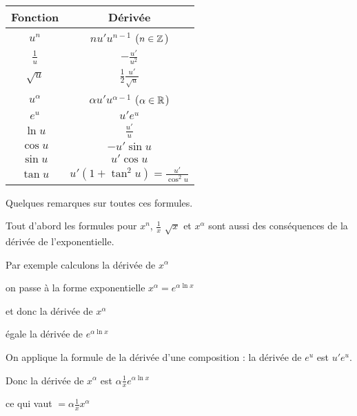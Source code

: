 \begin{tabular}[t]{cc@{\vrule depth 1.2ex height 3ex width 0mm \ }} 
\textbf{Fonction}         & \textbf{Dérivée} \\ \hline
   $u^n$         & $nu'u^{n-1}$  \quad  ($n \in \mathbb{Z}$)   \\ \hline
   $\frac 1u$    & $-\frac{u'}{u^2}$              \\ \hline
   $\sqrt{u}$    & $\frac12 \frac{u'}{\sqrt{u}}$   \\ \hline
   $u^\alpha$   & $\alpha u' u^{\alpha-1}$ \quad ($\alpha\in\mathbb{R}$)  \\ \hline
   $e^u$         & $u'e^u$                        \\ \hline
   $\ln u$       & $\frac {u'}{u}$                   \\ \hline
   $\cos u$      & $-u'\sin u$                    \\ \hline
   $\sin u$      & $u'\cos u$                     \\ \hline
   $\tan u$      & $u'(1+\tan^2 u) = \frac{u'}{\cos^2 u}$        \\ \hline
\end{tabular} 




\diapo

Quelques remarques sur toutes ces formules.

Tout d'abord les formules pour $x^n$, $\frac 1x$ $\sqrt x$ et $x^\alpha$ 
sont aussi des conséquences de la dérivée de l'exponentielle.

\change

Par exemple calculons la dérivée de $x^\alpha$

\change

on passe à la forme exponentielle $x^\alpha = e^{\alpha \ln x}$ 

\change

et donc la dérivée de $x^\alpha$

\change

égale la dérivée de $e^{\alpha \ln x}$

\change

On applique la formule de la dérivée d'une composition :
la dérivée de $e^u$ est $u'e^u$.

Donc la dérivée de $x^\alpha$
est $\alpha \frac{1}{x} e^{\alpha \ln x} $

\change

ce qui vaut 
$=\alpha \frac 1x x^{\alpha}$

